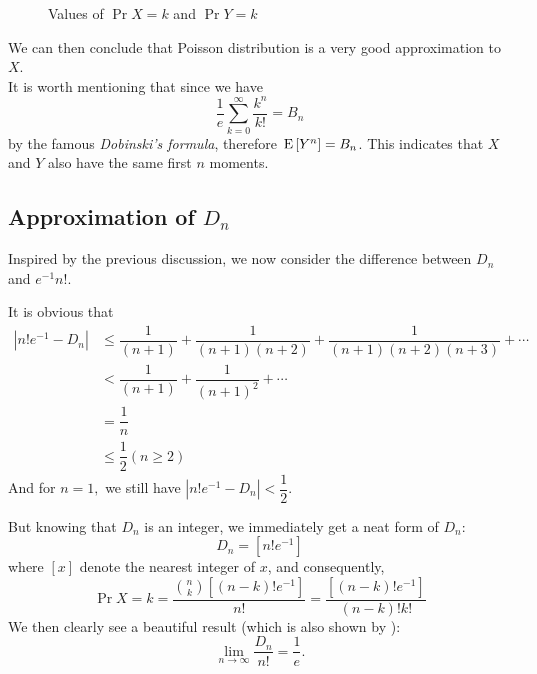 \begin{figure}[H]
{  }
  \caption{Values of $ \Pr{X=k}$ and $ \Pr{Y=k}$\label{fig:diff}}
\end{figure}

We can then conclude that Poisson distribution is a very good approximation to $ X$.
\\

It is worth mentioning that since we have
\[ \dfrac{1}{e}\sum_{k=0}^{\infty}\dfrac{k^n}{k!} = B_n\]
by the famous \emph{Dobinski's formula}, therefore $\text{E}\left[Y^n\right] = B_n$. This indicates that $ X$ and
$ Y$ also have the same first $ n$ moments.

\subsection{Approximation of $ D_n$}
Inspired by the previous discussion, we now consider the difference between $ D_n $ and $ e^{-1}n!$.

It is obvious that
\begin{align*}
|n! e^{-1} - D_n| & \le \dfrac{1}{(n+1)}+\dfrac{1}{(n+1)(n+2)}+ \dfrac{1}{(n+1)(n+2)(n+3)}+\cdots \\
&< \dfrac{1}{(n+1)} + \dfrac{1}{(n+1)^2 }+ \cdots  \\
& =\dfrac{1}{n}\\
& \le \dfrac{1}{2} ( n \ge 2)
\end{align*}
And for $ n=1,$ we still have $ |n!e^{-1}-D_n| < \dfrac{1}{2}.$

But knowing that $ D_n$ is an integer, we immediately get a neat form of $ D_n$:
\[  D_n = [ n!e^{-1}]\]
where $ [x]$ denote the nearest integer of $ x$, and consequently,
\[ \Pr{X=k} = \dfrac{{n\choose{k}}[(n-k)!e^{-1}]}{n!}= \dfrac{[(n-k)!e^{-1}]}{(n-k)!k!}\]
We then clearly see a beautiful result (which is also shown by ):
\[ \lim\limits_{n\to\infty}\dfrac{D_n}{n!} = \dfrac{1}{e}.\]


